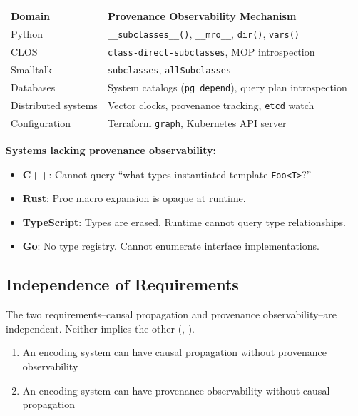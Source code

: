 \begin{center}
\begin{tabularx}{\linewidth}{lX}
\toprule
\textbf{Domain} & \textbf{Provenance Observability Mechanism} \\
\midrule
Python & \texttt{\_\_subclasses\_\_()}, \texttt{\_\_mro\_\_}, \texttt{dir()}, \texttt{vars()} \\
CLOS & \texttt{class-direct-subclasses}, MOP introspection \\
Smalltalk & \texttt{subclasses}, \texttt{allSubclasses} \\
Databases & System catalogs (\texttt{pg\_depend}), query plan introspection \\
Distributed systems & Vector clocks, provenance tracking, \texttt{etcd} watch \\
Configuration & Terraform \texttt{graph}, Kubernetes API server \\
\bottomrule
\end{tabularx}
\end{center}

\textbf{Systems lacking provenance observability:}
\begin{itemize}
\tightlist
\item \textbf{C++}: Cannot query ``what types instantiated template \texttt{Foo<T>}?''
\item \textbf{Rust}: Proc macro expansion is opaque at runtime.
\item \textbf{TypeScript}: Types are erased. Runtime cannot query type relationships.
\item \textbf{Go}: No type registry. Cannot enumerate interface implementations.
\end{itemize}

\subsection{Independence of Requirements}\label{sec:independence}

The two requirements--causal propagation and provenance observability--are independent. Neither implies the other (, ).

\begin{theorem}\label{thm:independence}
\begin{enumerate}
\tightlist
\item An encoding system can have causal propagation without provenance observability
\item An encoding system can have provenance observability without causal propagation
\end{enumerate}
\end{theorem}

